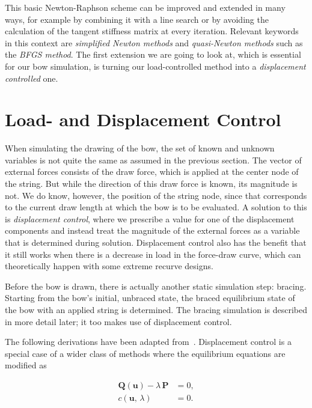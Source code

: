 This basic Newton-Raphson scheme can be improved and extended in many ways, for example by combining it with a line search or by avoiding the calculation of the tangent stiffness matrix at every iteration.
Relevant keywords in this context are \textit{simplified Newton methods} and \textit{quasi-Newton methods} such as the \textit{BFGS method}.
The first extension we are going to look at, which is essential for our bow simulation, is turning our load-controlled  method into a \textit{displacement controlled} one.

\newpage
\section{Load- and Displacement Control}
\label{sec:constrained-newton-raphson}

When simulating the drawing of the bow, the set of known and unknown variables is not quite the same as assumed in the previous section.
The vector of external forces consists of the draw force, which is applied at the center node of the string.
But while the direction of this draw force is known, its magnitude is not.
We do know, however, the position of the string node, since that corresponds to the current draw length at which the bow is to be evaluated.
A solution to this is \textit{displacement control}, where we prescribe a value for one of the displacement components and instead treat the magnitude of the external forces as a variable that is determined during solution.
Displacement control also has the benefit that it still works when there is a decrease in load in the force-draw curve, which can theoretically happen with some extreme recurve designs.

Before the bow is drawn, there is actually another static simulation step: bracing.
Starting from the bow's initial, unbraced state, the braced equilibrium state of the bow with an applied string is determined.
The bracing simulation is described in more detail later; it too makes use of displacement control.

The following derivations have been adapted from~\cite{bib:kuhl2002}. Displacement control is a special case of a wider class of methods where the equilibrium equations are modified as

\begin{align}
\boldsymbol{Q}(\boldsymbol{u}) - \lambda\,\boldsymbol{P} &= 0,\label{eq:equilibrium_dc}\\
c(\boldsymbol{u},\,\lambda) &= 0.\label{eq:constraint_dc}
\end{align}

